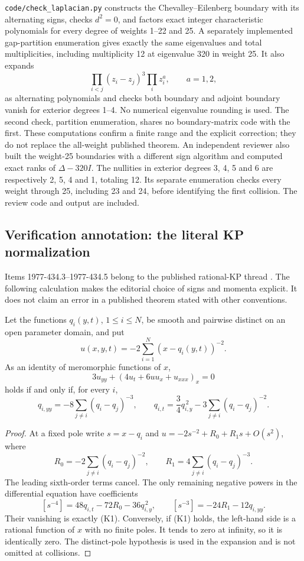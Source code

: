 \begin{remark}\oursComputed
\texttt{code/check\_laplacian.py} constructs the Chevalley--Eilenberg
boundary with its alternating signs, checks \(d^2=0\), and factors exact
integer characteristic polynomials for every degree of weights 1--22 and
25. A separately implemented gap-partition enumeration gives exactly the
same eigenvalues and total multiplicities, including multiplicity 12 at
eigenvalue 320 in weight 25. It also expands
\[
 \prod_{i<j}(z_i-z_j)^3\prod_i z_i^a,\qquad a=1,2,
\]
as alternating polynomials and checks both boundary and adjoint boundary
vanish for exterior degrees 1--4. No numerical eigenvalue rounding is
used. The second check, partition enumeration, shares no boundary-matrix
code with the first. These computations confirm a finite range and the
explicit correction; they do not replace the all-weight published theorem.
An independent reviewer also built the weight-25 boundaries with a different
sign algorithm and computed exact ranks of \(\Delta-320I\). The nullities
in exterior degrees 3, 4, 5 and 6 are respectively 2, 5, 4 and 1, totaling
12. Its separate enumeration checks every weight through 25, including
23 and 24, before identifying the first collision. The review code and
output are included.
\end{remark}

\subsection{Verification annotation: the literal KP normalization}
\label{dev:1977-kp-check}
Items 1977-434.3--1977-434.5 belong to the published rational-KP thread
\citep[Theorem~3 and its corollaries]{krichever1978rational}. The following
calculation makes the editorial choice of signs and momenta explicit. It
does not claim an error in a published theorem stated with other conventions.

\begin{proposition}\ours
Let the functions \(q_i(y,t)\), \(1\leq i\leq N\), be smooth and pairwise
distinct on an open parameter domain, and put
\[
 u(x,y,t)=-2\sum_{i=1}^N(x-q_i(y,t))^{-2}.
\]
As an identity of meromorphic functions of \(x\),
\[
 3u_{yy}+(4u_t+6uu_x+u_{xxx})_x=0
\]
holds if and only if, for every \(i\),
\[
 q_{i,yy}=-8\sum_{j\ne i}(q_i-q_j)^{-3},\qquad
 q_{i,t}=\frac34q_{i,y}^{\,2}-3\sum_{j\ne i}(q_i-q_j)^{-2}.
 \tag{K1}
\]
\end{proposition}
\begin{proof}
At a fixed pole write \(s=x-q_i\) and
\(u=-2s^{-2}+R_0+R_1s+O(s^2)\), where
\[
 R_0=-2\sum_{j\ne i}(q_i-q_j)^{-2},\qquad
 R_1=4\sum_{j\ne i}(q_i-q_j)^{-3}.
\]
The leading sixth-order terms cancel. The only remaining negative powers
in the differential equation have coefficients
\[
 [s^{-4}]=48q_{i,t}-72R_0-36q_{i,y}^{\,2},\qquad
 [s^{-3}]=-24R_1-12q_{i,yy}.
\]
Their vanishing is exactly (K1). Conversely, if (K1) holds, the left-hand
side is a rational function of \(x\) with no finite poles. It tends to
zero at infinity, so it is identically zero. The distinct-pole hypothesis
is used in the expansion and is not omitted at collisions.
\end{proof}

